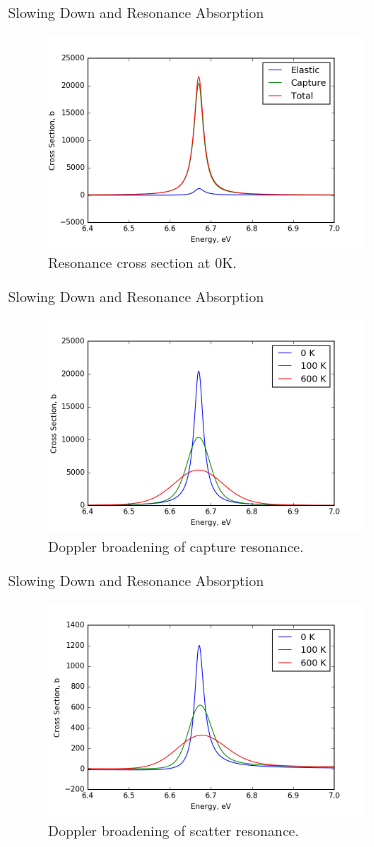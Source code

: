 \documentclass[presentation]{beamer}
\begin{document}
\begin{frame}[label={sec:orgheadline10}]{Slowing Down and Resonance Absorption}
\begin{figure}
  \centering
  \includegraphics[width=0.75\textwidth]{../notebooks/xs0.png}
  \caption{Resonance cross section at 0K.}
\end{figure}
\end{frame}
\begin{frame}[label={sec:orgheadline11}]{Slowing Down and Resonance Absorption}
\begin{figure}
  \centering
  \includegraphics[width=0.75\textwidth]{../notebooks/capture_broad.png}
  \caption{Doppler broadening of capture resonance.}
\end{figure}
\end{frame}

\begin{frame}[label={sec:orgheadline12}]{Slowing Down and Resonance Absorption}
\begin{figure}
  \centering
  \includegraphics[width=0.75\textwidth]{../notebooks/scatter_broad.png}
  \caption{Doppler broadening of scatter resonance.}
\end{figure}
\end{frame}
\end{document}
